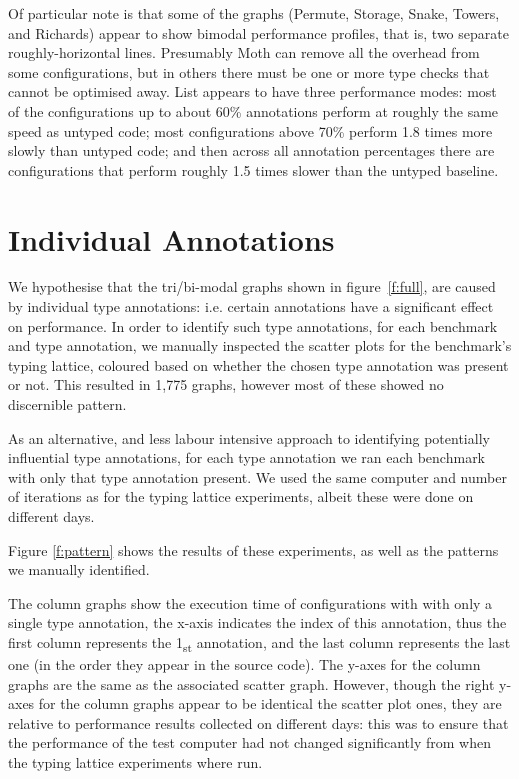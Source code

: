 \documentclass[sigplan,10pt,review,screen]{acmart}\settopmatter{printfolios=true}
\begin{document}
Of particular note is that some of the graphs (Permute, Storage, Snake, Towers, and Richards) appear to show bimodal performance profiles, that is, two separate roughly-horizontal lines. Presumably Moth can remove all the overhead from some configurations, but in others there must be one or more type checks that cannot be optimised away. List appears to have three performance modes: most of the configurations up to about 60\% annotations perform at roughly the same speed as untyped code; most configurations above 70\% perform 1.8 times more slowly than untyped code; and then across all annotation percentages there are configurations that perform roughly 1.5 times slower than the untyped baseline.



\section{Individual Annotations}
\label{s-individual}
\begin{figure*}
	
	\caption{Pairs of colour coded scatter and column graphs. The scatter graphs represent the performance of a sample of typing lattice. The column graphs show the performance of every configuration with only one type annotation. The scatter plots and columns graphs are colour coded based on whether a particular type annotation or two are present in the source code.}
	\label{f:pattern}		
\end{figure*}
We hypothesise that the tri/bi-modal graphs shown in figure~\ref{f:full}, are caused by individual type annotations: i.e. certain annotations have a significant effect on performance. In order to identify such type annotations, for each benchmark and type annotation, we manually inspected the scatter plots for the benchmark's typing lattice, coloured based on whether the chosen type annotation was present or not. This resulted in 1,775 graphs, however most of these showed no discernible pattern.

As an alternative, and less labour intensive approach to identifying potentially influential type annotations, for each type annotation we ran each benchmark with only that type annotation present. We used the same computer and number of iterations as for the typing lattice experiments, albeit these were done on different days.

Figure \ref{f:pattern} shows the results of these experiments, as well as the patterns we manually identified.

The column graphs show the execution time of configurations with with only a single type annotation, the x-axis indicates the index of this annotation, thus the first column represents the 1\textsubscript{st} annotation, and the last column represents the last one (in the order they appear in the source code). The y-axes for the column graphs are the same as the associated scatter graph. However, though the right y-axes for the column graphs appear to be identical the scatter plot ones, they are relative to performance results collected on different days: this was to ensure that the performance of the test computer had not changed significantly from when the typing lattice experiments where run.
\end{document}
